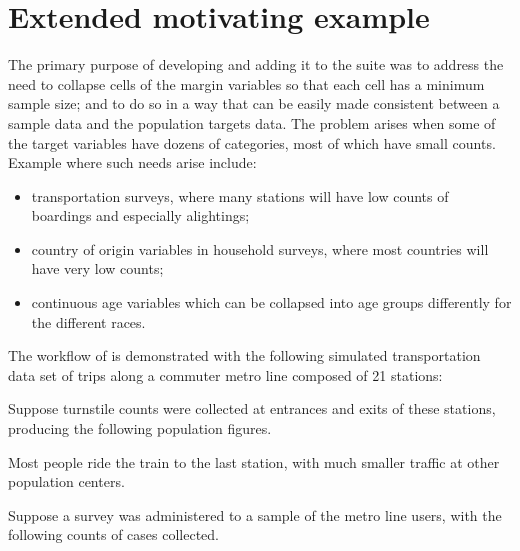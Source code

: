 
\section{Extended motivating example}
\label{subsec:example}

The primary purpose of developing  and adding it to the 
suite was to address the need
to collapse cells of the margin variables so that each cell has a minimum sample size;
and to do so in a way that can be easily made consistent between a sample data
and the population targets data. The problem arises when some of the target
variables have dozens of categories, most of which have small counts.
Example where such needs arise include:
\begin{itemize}
    \item transportation surveys, where many stations will have
        low counts of boardings and especially alightings;
    \item country of origin variables in household surveys,
        where most countries will have very low counts;
    \item continuous age variables which can be collapsed into
        age groups differently for the different races.
\end{itemize}

The workflow of  is demonstrated with the following
simulated transportation data set of trips along a commuter metro line composed of 21 stations:

\begin{stlog}
\nullskip
\end{stlog}

Suppose turnstile counts were collected at entrances and exits of these stations,
producing the following population figures.

\cnp

\label{page:station:daypart}

\noindent
\begin{stlog}
\nullskip
\end{stlog}

Most people ride the train to the last station, with much smaller traffic at other population centers.

Suppose a survey was administered to a sample of the metro line users, with the following counts
of cases collected.

